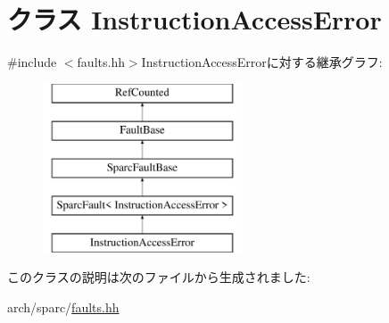 \hypertarget{classSparcISA_1_1InstructionAccessError}{
\section{クラス InstructionAccessError}
\label{classSparcISA_1_1InstructionAccessError}
}


{\ttfamily \#include $<$faults.hh$>$}InstructionAccessErrorに対する継承グラフ:\begin{figure}[H]
\begin{center}
\leavevmode
\includegraphics[height=5cm]{classSparcISA_1_1InstructionAccessError}
\end{center}
\end{figure}


このクラスの説明は次のファイルから生成されました:\begin{DoxyCompactItemize}
\item 
arch/sparc/\hyperlink{arch_2sparc_2faults_8hh}{faults.hh}\end{DoxyCompactItemize}
